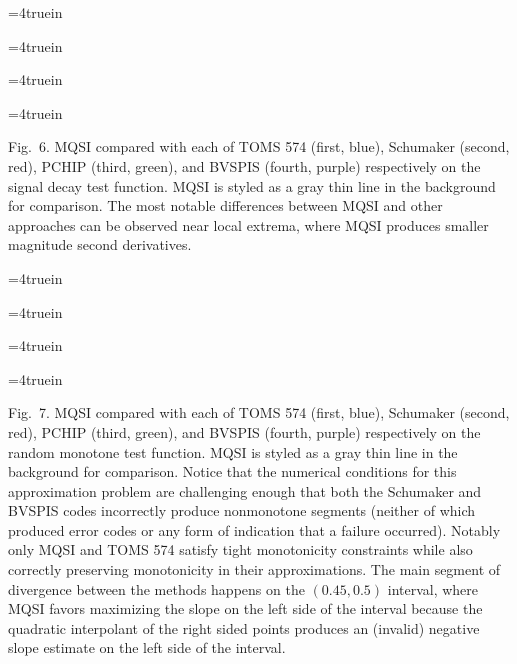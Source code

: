 \topinsert
\centerline{\epsfxsize=4truein }
\centerline{\epsfxsize=4truein }
\centerline{\epsfxsize=4truein }
\centerline{\epsfxsize=4truein }
{\narrower\noindent\rmVIII Fig.\ 6.
{\ttVIII MQSI} compared with each of TOMS 574 (first, blue), Schumaker
(second, red), PCHIP (third, green), and BVSPIS (fourth, purple)
respectively on the {\itVIII signal decay} test function. MQSI is
styled as a gray thin line in the background for comparison. The most
notable differences between MQSI and other approaches can be observed
near local extrema, where MQSI produces smaller magnitude second
derivatives.
\par}
\endinsert


\topinsert
\centerline{\epsfxsize=4truein }
\centerline{\epsfxsize=4truein }
\centerline{\epsfxsize=4truein }
\centerline{\epsfxsize=4truein }
{\narrower\noindent\rmVIII Fig.\ 7.
{\ttVIII MQSI} compared with each of TOMS 574 (first, blue), Schumaker
(second, red), PCHIP (third, green), and BVSPIS (fourth, purple)
respectively on the {\itVIII random monotone} test function. MQSI is
styled as a gray thin line in the background for comparison. Notice
that the numerical conditions for this approximation problem are
challenging enough that both the Schumaker and BVSPIS codes
incorrectly produce nonmonotone segments (neither of which produced
error codes or any form of indication that a failure
occurred). Notably only MQSI and TOMS 574 satisfy tight monotonicity
constraints while also correctly preserving monotonicity in their
approximations. The main segment of divergence between the methods
happens on the $(0.45, 0.5)$ interval, where MQSI favors maximizing
the slope on the left side of the interval because the quadratic
interpolant of the right sided points produces an (invalid) negative
slope estimate on the left side of the interval.
\par}
\endinsert
